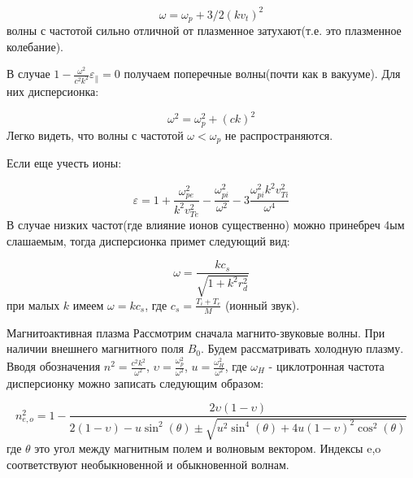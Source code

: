\documentclass[10pt, a4paper]{article}
\begin{document}
\begin{equation}
    \label{eq.Disp2}
    \omega=\omega_p + 3/2 (k v_{t})^2
\end{equation}
волны с частотой сильно отличной от плазменное затухают(т.е. это плазменное колебание).

В случае $1 - \frac{\omega^2}{c^2 k^2} \varepsilon_{\parallel}=0$ получаем поперечные волны(почти как в вакууме). Для них
дисперсионка:

\begin{equation}
    \label{eq.Disp3}
    \omega^2=\omega_p^2 + (c k)^2
\end{equation}
Легко видеть, что волны с частотой $\omega < \omega_p$ не распространяются.

Если еще учесть ионы:

\begin{equation}
    \label{eq.Disp4}
    \varepsilon=1+\frac{\omega_{pe}^2}{k^2 v_{Te}^2} - \frac{\omega_{pi}^2}{\omega^2}-3\frac{\omega_{pi}^2 k^2 v_{Ti}^2}{\omega^4}
\end{equation}
В случае низких частот(где влияние ионов существенно) можно принебреч 4ым слашаемым, тогда дисперсионка примет следующий вид:

\begin{equation}
    \label{eq.Disp5}
    \omega=\frac{k c_s}{\sqrt{1 + k^2 r_d^2}}
\end{equation}
при малых $k$ имеем $\omega=k c_s$, где $c_s=\frac{T_i + T_e}{M}$ (ионный звук).

Магнитоактивная плазма
Рассмотрим сначала магнито-звуковые волны. 
При наличии внешнего магнитного поля $B_0$. Будем рассматривать холодную плазму. Вводя обозначения $n^2=\frac{c^2 k^2}{\omega^2}$, $\upsilon=\frac{\omega_p^2}{\omega^2}$, $u=\frac{\omega_H^2}{\omega^2}$, где $\omega_H$ - циклотронная частота
дисперсионку можно записать следующим образом:

\begin{equation}
    \label{eq.Disp5}
    n_{e,o}^2=1-\frac{2\upsilon (1-\upsilon)}{2(1-\upsilon) - u \sin^2(\theta) \pm \sqrt{u^2 \sin^4(\theta) + 4u(1-\upsilon)^2 \cos^2(\theta)}} 
\end{equation}
где $\theta$ это угол между магнитным полем и волновым вектором. Индексы e,o соответствуют необыкновенной и обыкновенной волнам.
\newpage
{}


\end{document}
